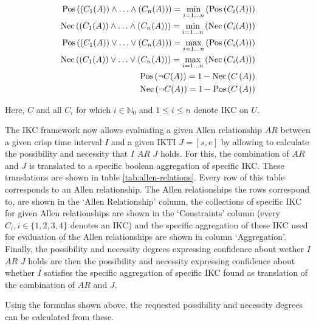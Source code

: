 \begin{align}
\operatorname{Pos}\left(\left(C_1(A)\right) \wedge \ldots \wedge \left(C_n(A)\right)\right) = \min_{i=1 \ldots n} \left(\operatorname{Pos}\left(C_i(A)\right)\right) \nonumber \\
\operatorname{Nec}\left(\left(C_1(A)\right) \wedge \ldots \wedge \left(C_n(A)\right)\right) = \min_{i=1 \ldots n} \left(\operatorname{Nec}\left(C_i(A)\right)\right) \nonumber \\
\operatorname{Pos}\left(\left(C_1(A)\right) \vee \ldots \vee \left(C_n(A)\right)\right) = \max_{i=1 \ldots n} \left(\operatorname{Pos}\left(C_i(A)\right)\right) \nonumber \\
\operatorname{Nec}\left(\left(C_1(A)\right) \vee \ldots \vee \left(C_n(A)\right)\right) = \max_{i=1 \ldots n} \left(\operatorname{Nec}\left(C_i(A)\right)\right) \nonumber \\
\operatorname{Pos}\left(\neg C(A)\right) = 1 - \operatorname{Nec}\left(C\left(A\right)\right) \nonumber \\
\operatorname{Nec}\left(\neg C(A)\right) = 1 - \operatorname{Pos}\left(C\left(A\right)\right) \nonumber
\end{align}

Here, $C$ and all $C_i$ for which $i \in \mathbb{N}_0$ and $1 \leq i \leq n$ denote IKC on $U$.

The IKC framework now allows evaluating a given Allen relationship $AR$ between a given crisp time interval $I$ and a given IKTI $J = \left[s, e\right]$ by allowing to calculate the possibility and necessity that $I$ $AR$ $J$ holds. For this, the combination of $AR$ and $J$ is translated to a specific boolean aggregation of specific IKC. These translations are shown in table \ref{tab:allen-relations}. Every row of this table corresponds to an Allen relationship. The Allen relationships the rows correspond to, are shown in the `Allen Relationship' column, the collections of specific IKC for given Allen relationships are shown in the `Constraints' column (every $C_i, i \in \{1, 2, 3, 4\}$ denotes an IKC) and the specific aggregation of these IKC used for evaluation of the Allen relationships are shown in column `Aggregation'. Finally, the possibility and necessity degrees expressing confidence about wether $I$ $AR$ $J$ holds are then the possibility and necessity expressing confidence about whether $I$ satisfies the specific aggregation of specific IKC found as translation of the combination of $AR$ and $J$.


Using the formulas shown above, the requested possibility and necessity degrees can be calculated from these.


